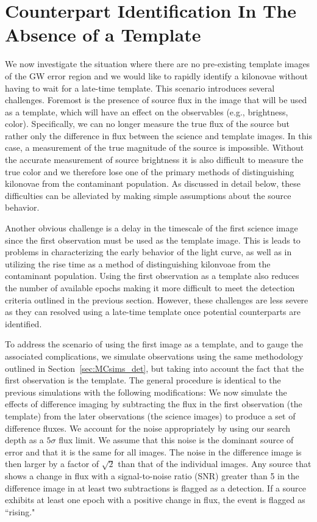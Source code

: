 \section{Counterpart Identification In The Absence of a Template} 
\label{sec:diff}
We now investigate the situation where there are no pre-existing template images of the GW error region and we would like to rapidly identify a kilonovae without having to wait for a late-time template. This scenario introduces several challenges. Foremost is the presence of source flux in the image that will be used as a template, which will have an effect on the observables (e.g., brightness, color). Specifically, we can no longer measure the true flux of the source but rather only the difference in flux between the science and template images. In this case, a measurement of the true magnitude of the source is impossible. Without the accurate measurement of source brightness it is also difficult to measure the true color and we therefore lose one of the primary methods of distinguishing kilonovae from the contaminant population. As discussed in detail below, these difficulties can be alleviated by making simple assumptions about the source behavior. 
   
Another obvious challenge is a delay in the timescale of the first science image since the first observation must be used as the template image. This is leads to problems in characterizing  the early behavior of the light curve, as well as in utilizing the rise time as a method of distinguishing kilonvoae from the contaminant population. Using the first observation as a template also reduces the number of available epochs making it more difficult to meet the detection criteria outlined in the previous section. However, these challenges are less severe as they can resolved using a late-time template once potential counterparts are identified.   
   
To address the scenario of using the first image as a template, and to gauge the associated complications, we simulate observations using the same methodology outlined in Section~\ref{sec:MCsims_det}, but taking into account the fact that the first observation is the template. The general procedure is identical to the previous simulations with the following modifications: We now simulate the effects of difference imaging by subtracting the flux in the first observation (the template) from the later observations (the science images) to produce a set of difference fluxes. We account for the noise appropriately by using our search depth as a $5\sigma$ flux limit. We assume that this noise is the dominant source of error and that it is the same for all images. The noise in the difference image is then larger by a factor of $\sqrt{2}$ than that of the individual images. Any source that shows a change in flux with a signal-to-noise ratio (SNR) greater than 5 in the difference image in at least two subtractions is flagged as a detection. If a source exhibits at least one epoch with a positive change in flux, the event is flagged as ``rising."

